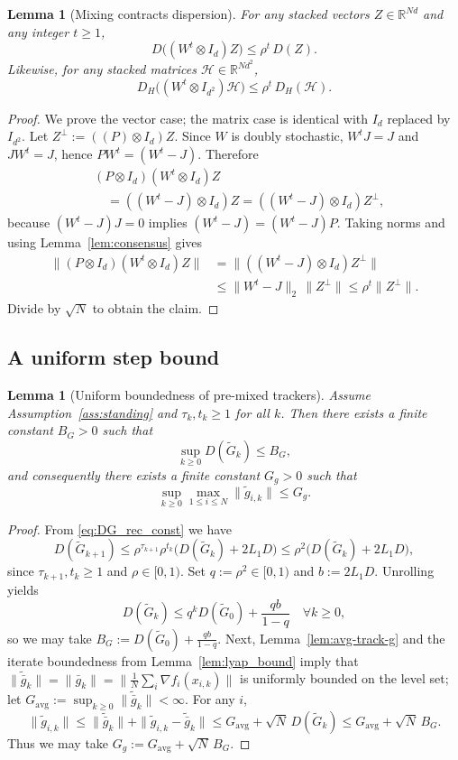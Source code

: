\documentclass[10pt,twocolumn,letterpaper]{article}
\def\one{1}%
\def\J{J}%
\def\Pmat{P}%
\theoremstyle{compact}
\newtheorem{lemma}[theorem]{Lemma}
\theoremstyle{compactremark}
\newcommand{\R}{\mathbb{R}}
\newcommand{\one}{\mathbf{1}}
\newcommand{\J}{\left(\frac{1}{N}\one\one^\top\right)}
\newcommand{\Pmat}{I-\J}
\begin{document}
\begin{lemma}[Mixing contracts dispersion]\label{lem:mix_contract}
For any stacked vectors $Z\in\R^{Nd}$ and any integer $t\ge1$,
\[
D\big((W^t\otimes I_d)Z\big)\le \rho^t\,D(Z).
\]
Likewise, for any stacked matrices $\mathcal H\in\R^{Nd^2}$,
\[
D_H\big((W^t\otimes I_{d^2})\mathcal H\big)\le \rho^t\,D_H(\mathcal H).
\]
\end{lemma}
\begin{proof}
We prove the vector case; the matrix case is identical with $I_d$ replaced by $I_{d^2}$.
Let $Z^\perp:=((\Pmat)\otimes I_d)Z$. Since $W$ is doubly stochastic, $W^t\J=\J$ and $\J W^t=\J$, hence
$\Pmat W^t=(W^t-\J)$. Therefore
\begin{align*}
&(\Pmat\!\otimes\! I_d)(W^t\!\otimes\! I_d)Z\\
&\quad=((W^t\!-\!\J)\!\otimes\! I_d)Z=((W^t\!-\!\J)\!\otimes\! I_d)Z^\perp,
\end{align*}
because $(W^t-\J)\J=0$ implies $(W^t-\J)=(W^t-\J)\Pmat$.
Taking norms and using Lemma~\ref{lem:consensus} gives
\begin{align*}
\|(\Pmat\!\otimes\! I_d)(W^t\!\otimes\! I_d)Z\|
&=\|((W^t\!-\!\J)\!\otimes\! I_d)Z^\perp\|\\
&\le \|W^t\!-\!\J\|_2\,\|Z^\perp\|
\le \rho^t\|Z^\perp\|.
\end{align*}
Divide by $\sqrt N$ to obtain the claim.
\end{proof}

\subsection{A uniform step bound}

\begin{lemma}[Uniform boundedness of pre-mixed trackers]\label{lem:tilde_track_bounded}
Assume Assumption~\ref{ass:standing} and $\tau_k,t_k\ge 1$ for all $k$.
Then there exists a finite constant $B_G>0$ such that
\[
\sup_{k\ge 0} D(\tilde G_k)\le B_G,
\]
and consequently there exists a finite constant $G_g>0$ such that
\[
\sup_{k\ge 0}\max_{1\le i\le N}\|\tilde g_{i,k}\|\le G_g.
\]
\end{lemma}
\begin{proof}
From \eqref{eq:DG_rec_const} we have
\[
D(\tilde G_{k+1})\le \rho^{\tau_{k+1}}\rho^{t_k}\big(D(\tilde G_k)+2L_1D\big)\le \rho^2\big(D(\tilde G_k)+2L_1D\big),
\]
since $\tau_{k+1},t_k\ge 1$ and $\rho\in[0,1)$.
Set $q:=\rho^2\in[0,1)$ and $b:=2L_1D$. Unrolling yields
\[
D(\tilde G_k)\le q^k D(\tilde G_0)+\frac{qb}{1-q}\quad\forall k\ge 0,
\]
so we may take $B_G:=D(\tilde G_0)+\frac{qb}{1-q}$.
Next, Lemma~\ref{lem:avg-track-g} and the iterate boundedness from Lemma~\ref{lem:lyap_bound} imply that
$\|\tilde{\bar g}_k\|=\|\bar g_k\|=\big\|\frac1N\sum_i \nabla f_i(x_{i,k})\big\|$ is uniformly bounded on the level set;
let $G_{\mathrm{avg}}:=\sup_{k\ge 0}\|\tilde{\bar g}_k\|<\infty$.
For any $i$,
\[
\|\tilde g_{i,k}\|\le \|\tilde{\bar g}_k\|+\|\tilde g_{i,k}-\tilde{\bar g}_k\|
\le G_{\mathrm{avg}}+\sqrt N\,D(\tilde G_k)\le G_{\mathrm{avg}}+\sqrt N\,B_G.
\]
Thus we may take $G_g:=G_{\mathrm{avg}}+\sqrt N\,B_G$.
\end{proof}
\end{document}
